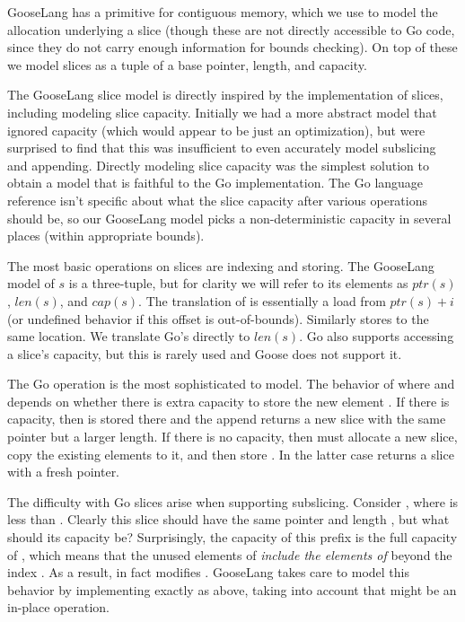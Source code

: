 GooseLang has a primitive for contiguous memory, which we use to model
the allocation underlying a slice (though these are not directly
accessible to Go code, since they do not carry enough information for
bounds checking). On top of these we model slices as a tuple of a base
pointer, length, and capacity.

The GooseLang slice model is directly inspired by the implementation of
slices, including modeling slice capacity. Initially we had a more
abstract model that ignored capacity (which would appear to be just an
optimization), but were surprised to find that this was insufficient to
even accurately model subslicing and appending. Directly modeling slice
capacity was the simplest solution to obtain a model that is faithful to
the Go implementation. The Go language reference isn't specific about
what the slice capacity after various operations should be, so our
GooseLang model picks a non-deterministic capacity in several places
(within appropriate bounds).

The most basic operations on slices are indexing and storing. The
GooseLang model of \(s\) is a three-tuple, but for clarity we will refer
to its elements as \(ptr(s)\), \(len(s)\), and \(cap(s)\). The
translation of  is essentially a load from
\(ptr(s) + i\) (or undefined behavior if this offset is out-of-bounds).
Similarly  stores to the same location. We
translate Go's  directly to \(len(s)\). Go also supports
accessing a slice's capacity, but this is rarely used and Goose does not
support it.

The Go  operation is the most sophisticated to model. The
behavior of  where  and
 depends on whether there is extra capacity to store the
new element . If there is capacity, then  is stored
there and the append returns a new slice with the same pointer but a
larger length. If there is no capacity, then  must
allocate a new slice, copy the existing elements to it, and then store
. In the latter case  returns a slice with a
fresh pointer.

The difficulty with Go slices arise when supporting subslicing. Consider
, where  is less than .
Clearly this slice should have the same pointer and length ,
but what should its capacity be? Surprisingly, the capacity of this
prefix is the full capacity of , which means that the unused
elements of  \emph{include the elements of }
beyond the index . As a result, 
in fact modifies . GooseLang takes care to model this
behavior by implementing  exactly as above, taking into
account that  might be an in-place operation.

